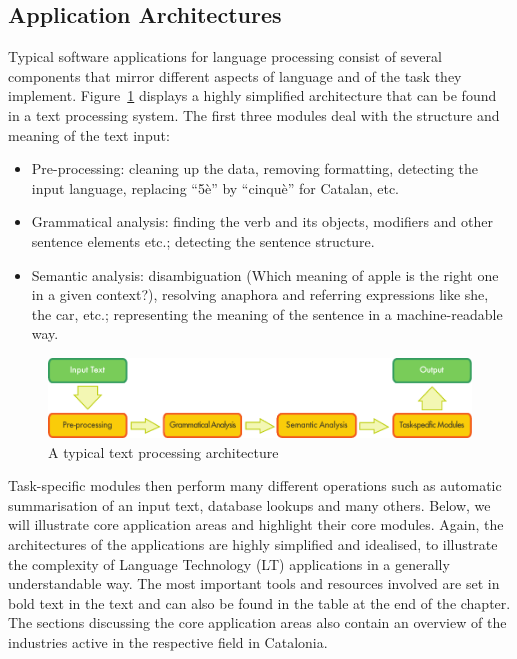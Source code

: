 \begin{multicols}{2}
\subsection{Application Architectures}

Typical software applications for language processing consist of several components that mirror different aspects of language and of the task they implement. Figure~\ref{fig:textprocessingarch_en} displays a highly simplified architecture that can be found in a text processing system. The first three modules deal with the structure and meaning of the text input:
\begin{itemize}
\item Pre-processing: cleaning up the data, removing formatting, detecting the input language, replacing “5è” by “cinquè” for Catalan, etc.
\item Grammatical analysis: finding the verb and its objects, modifiers and other sentence elements etc.; detecting the sentence structure.
\item Semantic analysis: disambiguation (Which meaning of apple is the right one in a given context?), resolving anaphora and referring expressions like she, the car, etc.; representing the meaning of the sentence in a machine-readable way.
\end{itemize}

\begin{figure}[b]
  \center
  \includegraphics[width=\textwidth]{../_media/english/text_processing_app_architecture}
  \caption{A typical text processing architecture}
  \label{fig:textprocessingarch_en}
\end{figure}

Task-specific modules then perform many different operations such as automatic summarisation of an input text, database lookups and many others. Below, we will illustrate core application areas and highlight their core modules. Again, the architectures of the applications are highly simplified and idealised, to illustrate the complexity of Language Technology (LT) applications in a generally understandable way. The most important tools and resources involved are set in bold text in the text and can also be found in the table at the end of the chapter.  The sections discussing the core application areas also contain an overview of the industries active in the respective field in Catalonia. 


\end{multicols}
